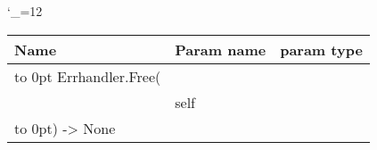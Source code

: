 \begingroup \catcode`\_=12 \tt
\begin{tabular}{lll}
\toprule
\textrm{Name}&\textrm{Param name}&\textrm{param type}\\
\midrule
\hbox to 0pt {Errhandler.Free(\hss}\\
& self\\
\hbox to 0pt{) -> None\hss}\\
\bottomrule
\end{tabular}
\endgroup
